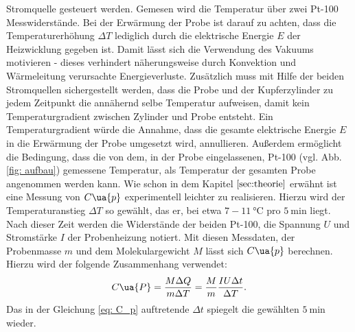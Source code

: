 Stromquelle gesteuert werden. Gemesen wird die Temperatur über zwei
Pt-100 Messwiderstände. Bei der Erwärmung der Probe ist darauf zu achten, dass
die Temperaturerhöhung $\Delta T$ lediglich durch die elektrische Energie $E$
der Heizwicklung gegeben ist. Damit lässt sich die Verwendung des Vakuums motivieren -
dieses verhindert näherungsweise durch Konvektion und
Wärmeleitung verursachte Energieverluste. Zusätzlich muss mit Hilfe der beiden Stromquellen sichergestellt
werden, dass die Probe und der Kupferzylinder zu jedem Zeitpunkt die annähernd
selbe Temperatur aufweisen, damit kein Temperaturgradient zwischen Zylinder und
Probe entsteht. Ein Temperaturgradient würde die Annahme, dass die gesamte elektrische
Energie $E$ in die Erwärmung der Probe umgesetzt wird, annullieren.
Außerdem ermöglicht die Bedingung, dass die von dem, in der Probe eingelassenen, Pt-100
(vgl. Abb. \ref{fig: aufbau}) gemessene Temperatur, als Temperatur der gesamten
Probe angenommen werden kann. Wie schon in dem Kapitel $\ref{sec:theorie}$ erwähnt
ist eine Messung von $C\ua{p}$ experimentell leichter zu realisieren.
Hierzu wird der Temperaturanstieg $\Delta T$ so gewählt, das er, bei
etwa $7-\SI{11}{\degreeCelsius}$ pro $\SI{5}{\minute}$ liegt. Nach dieser Zeit werden die
Widerstände der beiden Pt-100, die Spannung $U$ und Stromstärke $I$ der Probenheizung notiert.
Mit diesen Messdaten, der Probenmasse $m$ und dem Molekulargewicht $M$ lässt sich $C\ua{p}$
berechnen. Hierzu wird der folgende Zusammenhang verwendet:
\begin{equation}
  \label{eq: C_p}
  C\ua{P}=\frac{M \Delta Q}{m\Delta T} = \frac{M}{m}\frac{IU\Delta t}{\Delta T}.
\end{equation}
Das in der Gleichung \eqref{eq: C_p} auftretende $\Delta t$ spiegelt die gewählten $\SI{5}{\minute}$
wieder.
